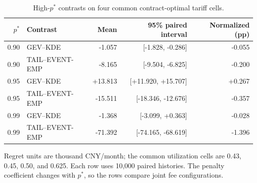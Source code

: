 \begin{table}[tbp]\centering\small
\caption{High-$p^*$ contrasts on four common contract-optimal tariff cells.}\label{tab:common-high-pstar}
\begin{tabular}{@{}rlrrr@{}}\toprule $p^*$ & Contrast & Mean & 95\% paired interval & Normalized (pp)\\\midrule
0.90 & GEV--KDE & -1.057 & [-1.828, -0.286] & -0.055\\
0.90 & TAIL--EVENT-EMP & -8.165 & [-9.504, -6.825] & -0.200\\
0.95 & GEV--KDE & +13.813 & [+11.920, +15.707] & +0.267\\
0.95 & TAIL--EVENT-EMP & -15.511 & [-18.346, -12.676] & -0.357\\
0.99 & GEV--KDE & -1.368 & [-3.099, +0.363] & -0.028\\
0.99 & TAIL--EVENT-EMP & -71.392 & [-74.165, -68.619] & -1.396\\
\bottomrule\end{tabular}\par\smallskip\footnotesize Regret units are thousand CNY/month; the common utilization cells are 0.43, 0.45, 0.50, and 0.625. Each row uses 10,000 paired histories. The penalty coefficient changes with $p^*$, so the rows compare joint fee configurations.\end{table}